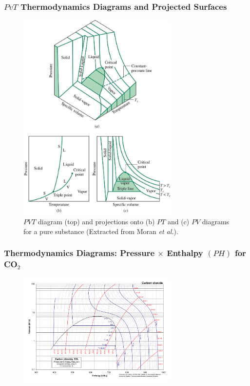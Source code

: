 \documentclass[10pt,compress]{beamer}
\begin{document}
\begin{frame}
 \frametitle{$PvT$ Thermodynamics Diagrams and Projected Surfaces}
  \begin{center}
   \begin{figure}
     \includegraphics[width=8cm,height=6.cm,clip]{./Pics/PVT_Surface.jpg}
\caption{$PVT$ diagram (top) and projections onto (b) $PT$ and (c) $PV$ diagrams for a pure substance (Extracted from Moran {\it et al.}).}
   \end{figure}
   \end{center}
\end{frame}
\begin{frame}
 \frametitle{Thermodynamics Diagrams: Pressure $\times$ Enthalpy $(PH)$ for CO$_{2}$}
  \begin{center}
   \begin{figure}
     \includegraphics[width=8cm,height=7.cm,clip]{./Pics/CO2col}
   \end{figure}
   \end{center}
\end{frame}
\end{document}

